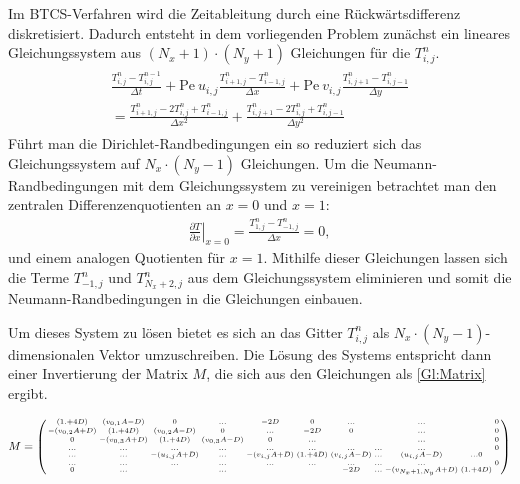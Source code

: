 Im BTCS-Verfahren wird die Zeitableitung durch eine Rückwärtsdifferenz diskretisiert. Dadurch entsteht in dem vorliegenden Problem zunächst ein lineares Gleichungssystem aus $(N_x+1)\cdot (N_y+1)$ Gleichungen für die $T^n_{i,j}$.
\begin{align}
  \begin{split}
  \frac{T^{n}_{i,j}-T^{n-1}_{i,j}}{\Delta t} + \text{Pe}~ u_{i,j} \frac{T^{n}_{i+1,j}-T^{n}_{i-1,j}}{\Delta x} + \text{Pe}~ v_{i,j} \frac{T^{n}_{i,j+1}-T^{n}_{i,j-1}}{\Delta y}\\
   =  \frac{T^{n}_{i+1,j}-2T^{n}_{i,j}+T^{n}_{i-1,j}}{\Delta x^2} +\frac{T^{n}_{i,j+1}-2T^{n}_{i,j}+T^{n}_{i,j-1}}{\Delta y^2}
 \end{split}\label{Gl:BTCS}
\end{align}
Führt man die Dirichlet-Randbedingungen ein so reduziert sich das Gleichungssystem auf $N_x \cdot (N_y-1)$ Gleichungen. Um die Neumann-Randbedingungen mit dem Gleichungssystem zu vereinigen betrachtet man den zentralen Differenzenquotienten an $x=0$ und $x=1$:
\begin{align}
  \left. \frac{\partial T}{\partial x}\right|_{x=0} = \frac{T^{n}_{1,j}-T^{n}_{-1,j}}{\Delta x} = 0, \nonumber
\end{align}
und einem analogen Quotienten für $x=1$. Mithilfe dieser Gleichungen lassen sich die Terme $T^{n}_{-1,j}$ und $T^{n}_{N_x+2,j}$ aus dem Gleichungssystem eliminieren und somit die Neumann-Randbedingungen in die Gleichungen einbauen.

Um dieses System zu lösen bietet es sich an das Gitter $T^n_{i,j}$ als $N_x \cdot (N_y-1)$-dimensionalen Vektor umzuschreiben.
Die Lösung des Systems entspricht dann einer Invertierung der Matrix $M$, die sich aus den Gleichungen als \cref{Gl:Matrix} ergibt.

\begin{align}
M=\left(\begin{medsize}\begin{smallmatrix}
(1.+4D)      & (v_{0,1}A-D) & 0          & ...       & -2D       & 0        &...       &&...       &&0    \\
-(v_{0,2}A+D) & (1.+4D)      & (v_{0,2}A-D) & 0         & ...      & -2D       &0       &&...       &&0    \\
0          &-(v_{0,3}A+D)  & (1.+4D)      &(v_{0,3}A-D) &0         &...       &       & &...       &&0 \\
...          & ...        &...         &...        &...       &...       &...       &...&...       &&0\\
...          &  ...       &-(u_{i,j}A+D)  &...        &-(v_{i,j}A+D)&(1.+4D)     &(v_{i,j}A-D)& ...      & (u_{i,j}A-D)&... 0\\
    ...         & ...        &...         &...        &...       &...       &...       &...&...       &&0\\
0          &...         &            &...        &           &         &-2D          &...       &-(v_{N_x+1,N_y}A+D) &(1.+4D)
\end{smallmatrix}\end{medsize}\right)\label{Gl:Matrix}
\end{align}



